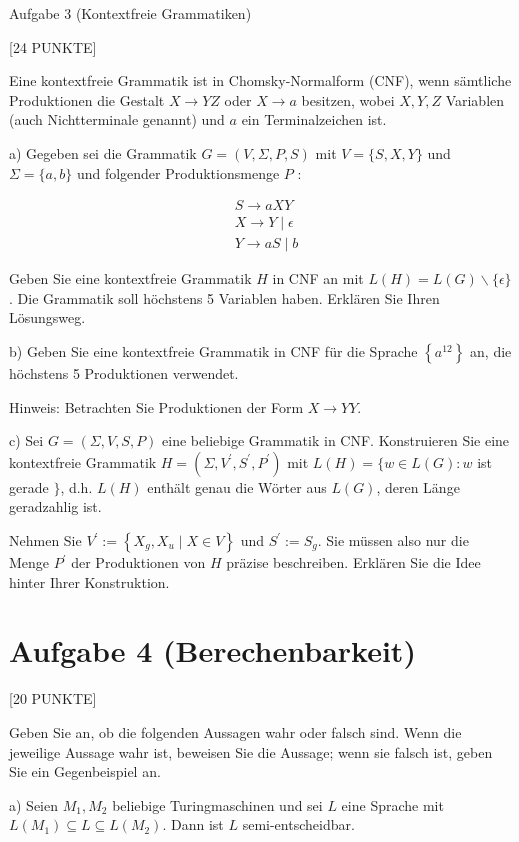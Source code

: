 \documentclass[10pt]{article}
\begin{document}
Aufgabe 3 (Kontextfreie Grammatiken)

[24 PUNKTE]

Eine kontextfreie Grammatik ist in Chomsky-Normalform (CNF), wenn sämtliche Produktionen die Gestalt $X \rightarrow Y Z$ oder $X \rightarrow a$ besitzen, wobei $X, Y, Z$ Variablen (auch Nichtterminale genannt) und $a$ ein Terminalzeichen ist.

a) Gegeben sei die Grammatik $G=(V, \Sigma, P, S)$ mit $V=\{S, X, Y\}$ und $\Sigma=\{a, b\}$ und folgender Produktionsmenge $P$ :

$$
\begin{aligned}
& S \rightarrow a X Y \\
& X \rightarrow Y \mid \epsilon \\
& Y \rightarrow a S \mid b
\end{aligned}
$$

Geben Sie eine kontextfreie Grammatik $H$ in CNF an mit $L(H)=L(G) \backslash\{\epsilon\}$. Die Grammatik soll höchstens 5 Variablen haben. Erklären Sie Ihren Lösungsweg.

b) Geben Sie eine kontextfreie Grammatik in CNF für die Sprache $\left\{a^{12}\right\}$ an, die höchstens 5 Produktionen verwendet.

Hinweis: Betrachten Sie Produktionen der Form $X \rightarrow Y Y$.

c) Sei $G=(\Sigma, V, S, P)$ eine beliebige Grammatik in CNF. Konstruieren Sie eine kontextfreie Grammatik $H=\left(\Sigma, V^{\prime}, S^{\prime}, P^{\prime}\right)$ mit $L(H)=\{w \in L(G): w$ ist gerade $\}$, d.h. $L(H)$ enthält genau die Wörter aus $L(G)$, deren Länge geradzahlig ist.

Nehmen Sie $V^{\prime}:=\left\{X_{g}, X_{u} \mid X \in V\right\}$ und $S^{\prime}:=S_{g}$. Sie müssen also nur die Menge $P^{\prime}$ der Produktionen von $H$ präzise beschreiben. Erklären Sie die Idee hinter Ihrer Konstruktion.

\section*{Aufgabe 4 (Berechenbarkeit)}
[20 PUNKTE]

Geben Sie an, ob die folgenden Aussagen wahr oder falsch sind. Wenn die jeweilige Aussage wahr ist, beweisen Sie die Aussage; wenn sie falsch ist, geben Sie ein Gegenbeispiel an.

a) Seien $M_{1}, M_{2}$ beliebige Turingmaschinen und sei $L$ eine Sprache mit $L\left(M_{1}\right) \subseteq L \subseteq L\left(M_{2}\right)$. Dann ist $L$ semi-entscheidbar.
\end{document}

